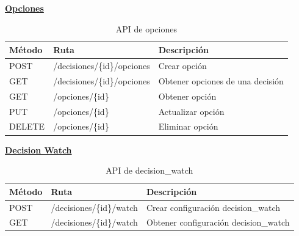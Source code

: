 \textbf{\uline{Opciones}}
\begin{table}[H]
\centering
\begin{tabular}{l l l}
\toprule
\textbf{Método} & \textbf{Ruta} & \textbf{Descripción} \\
\midrule
POST   & /decisiones/\{id\}/opciones & Crear opción \\
GET    & /decisiones/\{id\}/opciones & Obtener opciones de una decisión \\
GET    & /opciones/\{id\}            & Obtener opción \\
PUT    & /opciones/\{id\}            & Actualizar opción \\
DELETE & /opciones/\{id\}            & Eliminar opción \\
\bottomrule
\end{tabular}
\caption{API de opciones}
\end{table}

\textbf{\uline{Decision Watch}}
\begin{table}[H]
\centering
\begin{tabular}{l l l}
\toprule
\textbf{Método} & \textbf{Ruta} & \textbf{Descripción} \\
\midrule
POST & /decisiones/\{id\}/watch & Crear configuración decision\_watch \\
GET  & /decisiones/\{id\}/watch & Obtener configuración decision\_watch \\
\bottomrule
\end{tabular}
\caption{API de decision\_watch}
\end{table}

